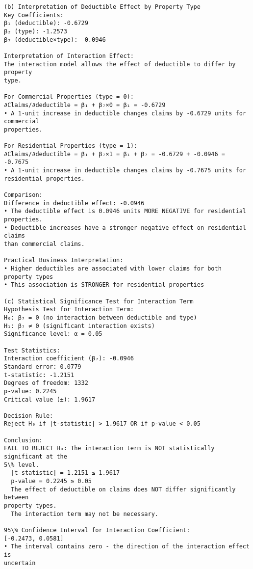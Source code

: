 \documentclass[8pt, twocolumn]{extarticle}
\begin{document}
    \begin{Verbatim}[commandchars=\\\{\}]
(b) Interpretation of Deductible Effect by Property Type
Key Coefficients:
β₁ (deductible): -0.6729
β₂ (type): -1.2573
β₇ (deductible×type): -0.0946

Interpretation of Interaction Effect:
The interaction model allows the effect of deductible to differ by property
type.

For Commercial Properties (type = 0):
∂Claims/∂deductible = β₁ + β₇×0 = β₁ = -0.6729
• A 1-unit increase in deductible changes claims by -0.6729 units for commercial
properties.

For Residential Properties (type = 1):
∂Claims/∂deductible = β₁ + β₇×1 = β₁ + β₇ = -0.6729 + -0.0946 = -0.7675
• A 1-unit increase in deductible changes claims by -0.7675 units for
residential properties.

Comparison:
Difference in deductible effect: -0.0946
• The deductible effect is 0.0946 units MORE NEGATIVE for residential
properties.
• Deductible increases have a stronger negative effect on residential claims
than commercial claims.

Practical Business Interpretation:
• Higher deductibles are associated with lower claims for both property types
• This association is STRONGER for residential properties

(c) Statistical Significance Test for Interaction Term
Hypothesis Test for Interaction Term:
H₀: β₇ = 0 (no interaction between deductible and type)
H₁: β₇ ≠ 0 (significant interaction exists)
Significance level: α = 0.05

Test Statistics:
Interaction coefficient (β₇): -0.0946
Standard error: 0.0779
t-statistic: -1.2151
Degrees of freedom: 1332
p-value: 0.2245
Critical value (±): 1.9617

Decision Rule:
Reject H₀ if |t-statistic| > 1.9617 OR if p-value < 0.05

Conclusion:
FAIL TO REJECT H₀: The interaction term is NOT statistically significant at the
5\% level.
  |t-statistic| = 1.2151 ≤ 1.9617
  p-value = 0.2245 ≥ 0.05
  The effect of deductible on claims does NOT differ significantly between
property types.
  The interaction term may not be necessary.

95\% Confidence Interval for Interaction Coefficient:
[-0.2473, 0.0581]
• The interval contains zero - the direction of the interaction effect is
uncertain
    \end{Verbatim}
    \begin{center}
    \end{center}
\end{document}
